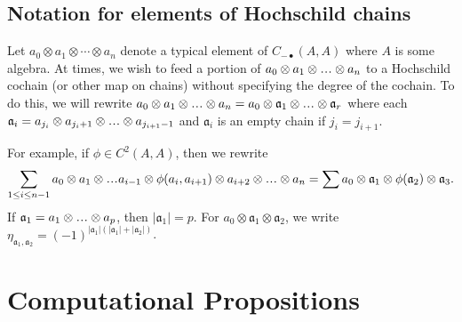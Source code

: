 \subsection{Notation for elements of Hochschild chains}
Let $a_0 \otimes a_1 \otimes \cdots \otimes a_n$ 
denote a typical element of $C_{-\bullet}(A,A)$ where 
$A$ is some algebra. At times, we wish to feed a portion 
of $a_0 \otimes a_1 \otimes \smdots \otimes a_n$ to a 
Hochschild cochain (or other map on chains) without 
specifying the degree of the cochain. To do this, 
we will rewrite $a_0 \otimes a_1 \otimes \smdots \otimes a_n 
= a_0 \otimes \mathfrak{a}_1 \otimes \smdots \otimes \mathfrak{a}_r$ 
where each $\mathfrak{a}_i = a_{j_i} \otimes a_{j_i+1} \otimes 
\smdots \otimes a_{j_{i+1}-1}$ and $\mathfrak{a}_i$ 
is an empty chain if $j_i = j_{i+1}$.

For example, if $\phi \in C^2(A,A)$, then we 
rewrite 
$$
\sum \limits_{1\leq i \leq n-1} 
a_0 \otimes a_1 \otimes \smdots a_{i-1} \otimes 
\phi(a_i, a_{i+1}) \otimes a_{i+2} \otimes \smdots \otimes a_n
=
\sum
a_0 \otimes \mathfrak{a}_1 \otimes \phi(\mathfrak{a}_2)
\otimes \mathfrak{a}_3.
$$
If $\mathfrak{a}_1 = a_1 \otimes \smdots \otimes a_p$, 
then $|\mathfrak{a}_1| = p$. For $a_0\otimes \mathfrak{a}_1
\otimes \mathfrak{a}_2$, we write 
$\eta_{\mathfrak{a}_1,\mathfrak{a}_2} = 
(-1)^{|\mathfrak{a}_1|(|\mathfrak{a}_1| + 
|\mathfrak{a}_2|)}$.

\section{Computational Propositions}




